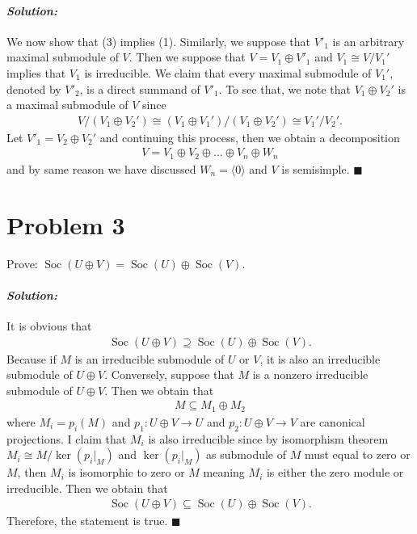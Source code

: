 \documentclass[12pt, a4paper]{article}
\theoremstyle{remark}
\newenvironment{solution}
  {\paragraph{\textit{Solution:}}\par\medskip}
  {\hfill$\blacksquare$\vspace{0.1cm}}
\begin{document}
\begin{solution}
    We now show that (3) implies (1). Similarly, we suppose that $V'_1$ is an arbitrary maximal submodule of $V$.
    Then we suppose that $V=V_1\oplus V'_1$ and $V_1\cong V/V_1'$ implies that $V_1$ is irreducible.
    We claim that every maximal submodule of $V_1'$, denoted by $V'_2$, is a direct summand of $V'_1$. To see that, we note that $V_1\oplus V_2'$ is a maximal submodule of $V$ since 
    \begin{align*}
        V/(V_1\oplus V_2')\cong (V_1\oplus V_1')/(V_1\oplus V_2')\cong V_1'/V_2'.
    \end{align*}
    Let $V'_1= V_2\oplus V_2'$ and continuing this process, then we obtain a decomposition
    \begin{align*}
         V = V_1\oplus V_2\oplus \dots \oplus V_n \oplus W_n
    \end{align*}
    and by same reason we have discussed $W_n=\langle 0 \rangle$ and $V$ is semisimple.
\end{solution}



\section*{Problem 3}
Prove: $\operatorname{Soc}(U \oplus V) = \operatorname{Soc}(U) \oplus \operatorname{Soc}(V)$.
\begin{solution}
    It is obvious that
    \begin{align*}
        \operatorname{Soc}(U \oplus V) \supseteq \operatorname{Soc}(U) \oplus \operatorname{Soc}(V).
    \end{align*}
    Because if $M$ is an irreducible submodule of $U$ or $V$, it is also an irreducible submodule of $U\oplus V$.
    Conversely, suppose that $M$ is a nonzero irreducible submodule of $U\oplus V$. 
    Then we obtain that 
    \begin{align*}
        M\subseteq M_1 \oplus M_2
    \end{align*}
    where $M_i=p_i(M)$ and $p_1:U \oplus V\to U$ and $p_2:U \oplus V\to V$ are canonical projections. 
    I claim that $M_i$ is also irreducible since by isomorphism theorem $M_i\cong M/\ker(p_i|_{M})$ and $\ker(p_i|_{M})$ as submodule of $M$ must
    equal to zero or $M$, then $M_i$ is isomorphic to zero or $M$ meaning $M_i$ is either the zero module or irreducible.
    Then we obtain that
    \begin{align*}
        \operatorname{Soc}(U \oplus V) \subseteq \operatorname{Soc}(U) \oplus \operatorname{Soc}(V).
    \end{align*}
    Therefore, the statement is true.
\end{solution}
\end{document}
